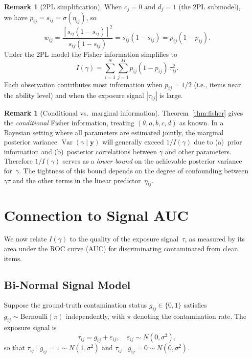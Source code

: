 \documentclass[11pt,a4paper]{article}
\theoremstyle{definition}
\newtheorem{remark}[theorem]{Remark}
\DeclareMathOperator{\Var}{Var}
\begin{document}
\begin{remark}[2PL simplification]\label{rem:2pl}
When $c_j = 0$ and $d_j = 1$ (the 2PL submodel), we have
$p_{ij} = s_{ij} = \sigma(\eta_{ij})$, so
\begin{equation}\label{eq:w_2pl}
  w_{ij}
  = \frac{[s_{ij}(1-s_{ij})]^2}{s_{ij}(1-s_{ij})}
  = s_{ij}(1-s_{ij})
  = p_{ij}(1-p_{ij}).
\end{equation}
Under the 2PL model the Fisher information simplifies to
\begin{equation}\label{eq:fisher_2pl}
  I(\gamma)
  = \sum_{i=1}^{N}\sum_{j=1}^{M}
    p_{ij}(1-p_{ij})\,\tau_{ij}^2.
\end{equation}
Each observation contributes most information when $p_{ij} = 1/2$
(i.e., items near the ability level) and when the exposure signal $|\tau_{ij}|$
is large.
\end{remark}


\begin{remark}[Conditional vs.\ marginal information]\label{rem:marginal}
Theorem~\ref{thm:fisher} gives the \emph{conditional} Fisher information,
treating $(\theta, a, b, c, d)$ as known.
In a Bayesian setting where all parameters are estimated jointly,
the marginal posterior variance $\Var(\gamma\mid\mathbf{y})$ will generally
exceed $1/I(\gamma)$ due to (a)~prior information and (b)~posterior correlations
between $\gamma$ and other parameters.
Therefore $1/I(\gamma)$ serves as a \emph{lower bound} on the achievable
posterior variance for~$\gamma$.
The tightness of this bound depends on the degree of confounding between
$\gamma\tau$ and the other terms in the linear predictor~$\eta_{ij}$.
\end{remark}


\section{Connection to Signal AUC}\label{sec:auc}

We now relate $I(\gamma)$ to the quality of the exposure signal~$\tau$,
as measured by its area under the ROC curve (AUC) for discriminating
contaminated from clean items.

\subsection{Bi-Normal Signal Model}\label{ssec:binormal}

Suppose the ground-truth contamination status $g_{ij}\in\{0,1\}$ satisfies
$g_{ij}\sim\mathrm{Bernoulli}(\pi)$ independently,
with $\pi$ denoting the contamination rate.
The exposure signal is
\begin{equation}\label{eq:exposure_dgp}
  \tau_{ij} = g_{ij} + \varepsilon_{ij},
  \quad \varepsilon_{ij}\sim N(0,\sigma^2),
\end{equation}
so that
$\tau_{ij}\mid g_{ij}=1 \sim N(1,\sigma^2)$ and
$\tau_{ij}\mid g_{ij}=0 \sim N(0,\sigma^2)$.
\end{document}
